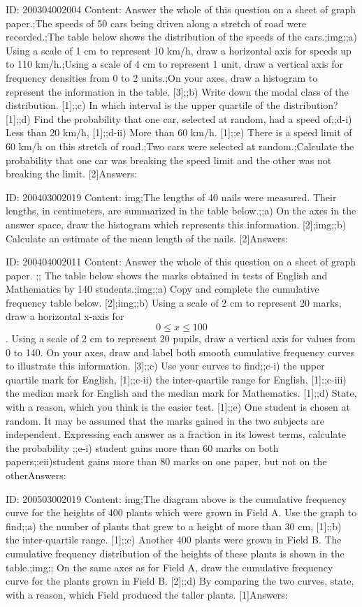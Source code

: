 \documentclass{article}
\begin{document}
ID: 200304002004
Content:
Answer the whole of this question on a sheet of graph paper.;The speeds of 50 cars being driven along a stretch of road were recorded.;The table below shows the distribution of the speeds of the cars.;img;;a) Using a scale of 1 cm to represent 10 km/h, draw a horizontal axis for speeds up to 110 km/h.;Using a scale of 4 cm to represent 1 unit, draw a vertical axis for frequency densities from 0 to 2 units.;On your axes, draw a histogram to represent the information in the table.   [3];;b) Write down the modal class of the distribution.   [1];;c) In which interval is the upper quartile of the distribution?   [1];;d) Find the probability that one car, selected at random, had a speed of;;d-i) Less than 20 km/h,   [1];;d-ii) More than 60 km/h.   [1];;e) There is a speed limit of 60 km/h on this stretch of road.;Two cars were selected at random.;Calculate the probability that one car was breaking the speed limit and the other was not breaking the limit.   [2]Answers:

ID: 200403002019
Content:
img;The lengths of 40 nails were measured. Their lengths, in centimeters, are summarized in the table below.;;a) On the axes in the answer space, draw the histogram which represents this information. [2];img;;b) Calculate an estimate of the mean length of the nails. [2]Answers:

ID: 200404002011
Content:
Answer the whole of this question on a sheet of graph paper. ;; The table below shows the marks obtained in tests of English and Mathematics by 140 students.;img;;a) Copy and complete the cumulative frequency table below. [2];img;;b) Using a scale of 2 cm to represent 20 marks, draw a horizontal x-axis for $$0\leq x\leq 100$$. Using a scale of 2 cm to represent 20 pupils, draw a vertical axis for values from 0 to 140. On your axes, draw and label both smooth cumulative frequency curves to illustrate this information. [3];;c) Use your curves to find;;c-i) the upper quartile mark for English, [1];;c-ii) the inter-quartile range for English, [1];;c-iii) the median mark for English and the median mark for Mathematics. [1];;d) State, with a reason, which you think is the easier test. [1];;e) One student is chosen at random. It may be assumed that the marks gained in the two subjects are independent. Expressing each answer as a fraction in its lowest terms, calculate the probability ;;e-i) student gains more than 60 marks on both papers;;eii)student gains more than 80 marks on one paper, but not on the otherAnswers:

ID: 200503002019
Content:
img;The diagram above is the cumulative frequency curve for the heights of 400 plants which were grown in Field A. Use the graph to find;;a) the number of plants that grew to a height of more than 30 cm, [1];;b) the inter-quartile range. [1];;c) Another 400 plants were grown in Field B. The cumulative frequency distribution of the heights of these plants is shown in the table.;img;; On the same axes as for Field A, draw the cumulative frequency curve for the plants grown in Field B. [2];;d) By comparing the two curves, state, with a reason, which Field produced the taller plants. [1]Answers:
\end{document}
